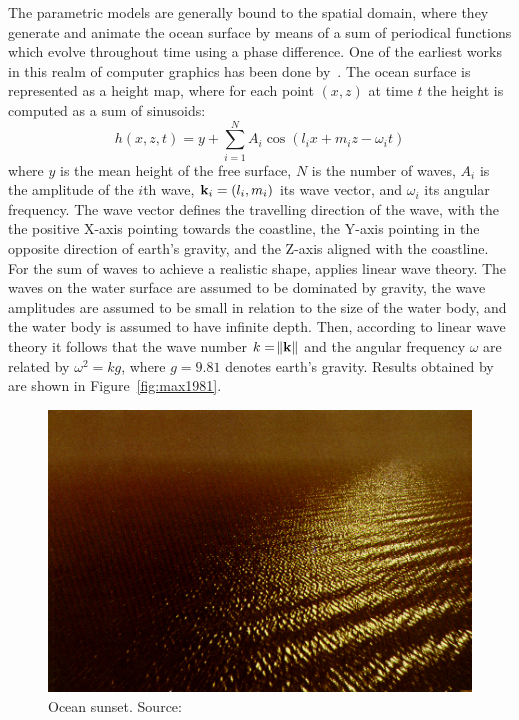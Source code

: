 %
The parametric models are generally bound to the spatial domain, where they
generate and animate the ocean surface by means of a sum of periodical functions
which evolve throughout time using a phase difference. One of the earliest works
in this realm of computer graphics has been done by~\citet{Max:1981}. The ocean
surface is represented as a height map, where for each point $(x,z)$ at time $t$
the height is computed as a sum of sinusoids:
\begin{equation}
h(x,z,t) = y + \sum_{i=1}^N A_i \cos (l_i x + m_i z - \omega_i t)
\end{equation}
where $y$ is the mean height of the free surface, $N$ is the number of waves,
$A_i$ is the amplitude of the $i$th wave, $\mathbf{k}_i = (l_i, m_i)$ its wave
vector, and $\omega_i$ its angular frequency. The wave vector defines the
travelling direction of the wave, with the the positive X-axis pointing towards
the coastline, the Y-axis pointing in the opposite direction of earth's gravity,
and the Z-axis aligned with the coastline. For the sum of waves to achieve a
realistic shape, \citeauthor{Max:1981} applies linear wave theory.
The waves on the water surface are assumed to be dominated by gravity, the wave
amplitudes are assumed to be small in relation to the size of the water body,
and the water body is assumed to have infinite depth. Then, according to linear
wave theory it follows that the wave number $k=\norm{\mathbf{k}}$ and the angular
frequency $\omega$ are related by $\omega^2=kg$, where $g=9.81$ denotes earth's
gravity. Results obtained by~\citeauthor{Max:1981} are shown in
Figure~\ref{fig:max1981}.
%
\begin{figure}
 \centering
 \includegraphics[scale=0.25]{figures/An_Image_Synthesizer_-_Perlin_1985-021.png}
 \caption{Ocean sunset. Source:~\cite{Perlin:1985}}
\label{fig:perlin1985}
\end{figure}
%

